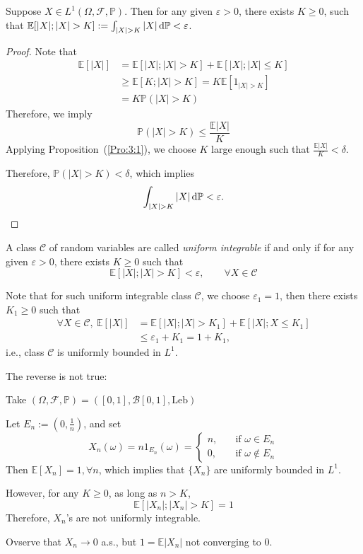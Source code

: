\begin{corollary}
Suppose $X\in L^1(\Omega,\mathcal{F},\mathbb{P})$.
Then for any given $\varepsilon>0$, there exists $K\ge0$,
such that $\mathbb{E}[|X|;|X|>K]:=\int_{|X|>K}|X|\diff\mathbb{P}<\varepsilon$.
\end{corollary}
\begin{proof}
Note that
\begin{align*}
\mathbb{E}[|X|]&=\mathbb{E}[|X|;|X|>K]+\mathbb{E}[|X|;|X|\le K]\\
&\ge \mathbb{E}[K;|X|>K]
=K\mathbb{E}[1_{|X|>K}]\\&=K\mathbb{P}(|X|>K)
\end{align*}
Therefore, we imply
\[
\mathbb{P}(|X|>K)\le\frac{\mathbb{E}|X|}{K}
\]
Applying Proposition~(\ref{Pro:3:1}), we choose $K$ large enough such that $\frac{\mathbb{E}|X|}{K}<\delta$.

Therefore, $\mathbb{P}(|X|>K)<\delta$, which implies
\[
\int_{|X|>K}|X|\diff\mathbb{P}<\varepsilon.
\]

\end{proof}

\begin{definition}
A class $\mathcal{C}$ of random variables are called \emph{uniform integrable} if and only if for any given $\varepsilon>0$, there exists $K\ge0$ such that
\[
\mathbb{E}[|X|;|X|>K]<\varepsilon,\qquad
\forall X\in\mathcal{C}
\]
\end{definition}

\begin{remark}
Note that for such uniform integrable class $\mathcal{C}$, we choose $\varepsilon_1=1$, then there exists $K_1\ge0$ such that
\begin{align*}
\forall X\in\mathcal{C},\
\mathbb{E}[|X|]&=\mathbb{E}[|X|;|X|>K_1]+\mathbb{E}[|X|;X\le K_1]\\
&\le\varepsilon_1+K_1=1+K_1,
\end{align*}
i.e., class $\mathcal{C}$ is uniformly bounded in $L^1$.
\end{remark}

The reverse is not true:
\begin{example}
Take $(\Omega,\mathcal{F},\mathbb{P})=([0,1],\mathcal{B}[0,1],\text{Leb})$

Let $E_n:=(0,\frac{1}{n})$, and set 
\[
X_n(\omega)=n1_{E_n}(\omega)=\left\{
\begin{aligned}
n,&\quad\text{if }\omega\in E_n\\
0,&\quad\text{if }\omega\notin E_n
\end{aligned}
\right.
\]
Then $\mathbb{E}[X_n]=1, \forall n$, which implies that $\{X_n\}$ are uniformly bounded in $L^1$.

However, for any $K\ge0$, as long as $n>K$, 
\[
\mathbb{E}[|X_n|;|X_n|>K]=1
\]
Therefore, $X_n$'s are not uniformly integrable.

Ovserve that $X_n\to0$ a.s., but $1=\mathbb{E}|X_n|$ not converging to 0.
\end{example}

